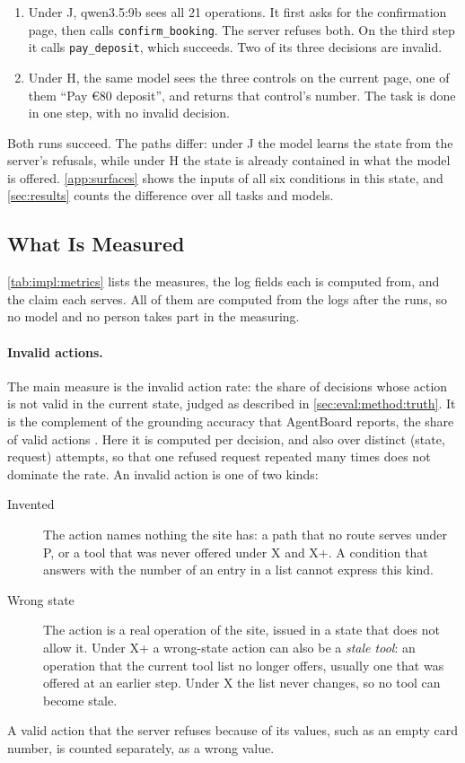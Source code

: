 \begin{enumerate}
    \item Under J, qwen3.5:9b sees all 21 operations.
    It first asks for the confirmation page, then calls \texttt{confirm\_booking}.
    The server refuses both.
    On the third step it calls \texttt{pay\_deposit}, which succeeds.
    Two of its three decisions are invalid.
    \item Under H, the same model sees the three controls on the current page, one of them ``Pay €80 deposit'', and returns that control's number.
    The task is done in one step, with no invalid decision.
\end{enumerate}

Both runs succeed.
The paths differ: under J the model learns the state from the server's refusals, while under H the state is already contained in what the model is offered.
\autoref{app:surfaces} shows the inputs of all six conditions in this state, and \autoref{sec:results} counts the difference over all tasks and models.

\FloatBarrier

\subsection{What Is Measured}\label{sec:eval:method:metrics}

\autoref{tab:impl:metrics} lists the measures, the log fields each is computed from, and the claim each serves.
All of them are computed from the logs after the runs, so no model and no person takes part in the measuring.

\paragraph{Invalid actions.}
The main measure is the invalid action rate: the share of decisions whose action is not valid in the current state, judged as described in \autoref{sec:eval:method:truth}.
It is the complement of the grounding accuracy that AgentBoard reports, the share of valid actions \cite{ma2024agentboard}.
Here it is computed per decision, and also over distinct (state, request) attempts, so that one refused request repeated many times does not dominate the rate.
An invalid action is one of two kinds:
\begin{description}
    \item[Invented] The action names nothing the site has: a path that no route serves under P, or a tool that was never offered under X and X+.
    A condition that answers with the number of an entry in a list cannot express this kind.
    \item[Wrong state] The action is a real operation of the site, issued in a state that does not allow it.
    Under X+ a wrong-state action can also be a \emph{stale tool}: an operation that the current tool list no longer offers, usually one that was offered at an earlier step.
    Under X the list never changes, so no tool can become stale.
\end{description}
A valid action that the server refuses because of its values, such as an empty card number, is counted separately, as a wrong value.

